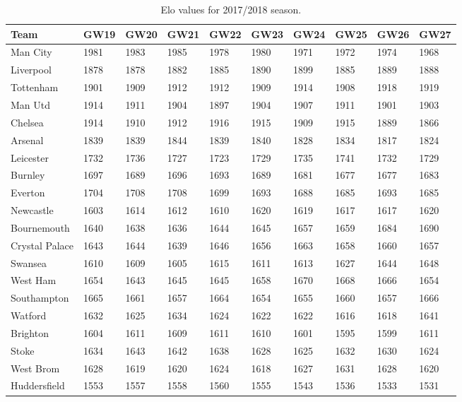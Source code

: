 \begin{table}[H]
\centering
\smaller
\begin{tabular}{|l|l|l|l|l|l|l|l|l|l|}
\hline
Team           & GW19 & GW20 & GW21 & GW22 & GW23 & GW24 & GW25 & GW26 & GW27 \\
\hline
Man City       & 1981 & 1983 & 1985 & 1978 & 1980 & 1971 & 1972 & 1974 & 1968 \\
Liverpool      & 1878 & 1878 & 1882 & 1885 & 1890 & 1899 & 1885 & 1889 & 1888 \\
Tottenham      & 1901 & 1909 & 1912 & 1912 & 1909 & 1914 & 1908 & 1918 & 1919 \\
Man Utd        & 1914 & 1911 & 1904 & 1897 & 1904 & 1907 & 1911 & 1901 & 1903 \\
Chelsea        & 1914 & 1910 & 1912 & 1916 & 1915 & 1909 & 1915 & 1889 & 1866 \\
Arsenal        & 1839 & 1839 & 1844 & 1839 & 1840 & 1828 & 1834 & 1817 & 1824 \\
Leicester      & 1732 & 1736 & 1727 & 1723 & 1729 & 1735 & 1741 & 1732 & 1729 \\
Burnley        & 1697 & 1689 & 1696 & 1693 & 1689 & 1681 & 1677 & 1677 & 1683 \\
Everton        & 1704 & 1708 & 1708 & 1699 & 1693 & 1688 & 1685 & 1693 & 1685 \\
Newcastle      & 1603 & 1614 & 1612 & 1610 & 1620 & 1619 & 1617 & 1617 & 1620 \\
Bournemouth    & 1640 & 1638 & 1636 & 1644 & 1645 & 1657 & 1659 & 1684 & 1690 \\
Crystal Palace & 1643 & 1644 & 1639 & 1646 & 1656 & 1663 & 1658 & 1660 & 1657 \\
Swansea        & 1610 & 1609 & 1605 & 1615 & 1611 & 1613 & 1627 & 1644 & 1648 \\
West Ham       & 1654 & 1643 & 1645 & 1645 & 1658 & 1670 & 1668 & 1666 & 1654 \\
Southampton    & 1665 & 1661 & 1657 & 1664 & 1654 & 1655 & 1660 & 1657 & 1666 \\
Watford        & 1632 & 1625 & 1634 & 1624 & 1622 & 1622 & 1616 & 1618 & 1641 \\
Brighton       & 1604 & 1611 & 1609 & 1611 & 1610 & 1601 & 1595 & 1599 & 1611 \\
Stoke          & 1634 & 1643 & 1642 & 1638 & 1628 & 1625 & 1632 & 1630 & 1624 \\
West Brom      & 1628 & 1619 & 1620 & 1624 & 1618 & 1627 & 1631 & 1628 & 1620 \\
Huddersfield   & 1553 & 1557 & 1558 & 1560 & 1555 & 1543 & 1536 & 1533 & 1531 \\
\hline
\end{tabular}
\caption{Elo values for 2017/2018 season.}
\label{tab:elo_values_gameweeks_3}
\end{table}


